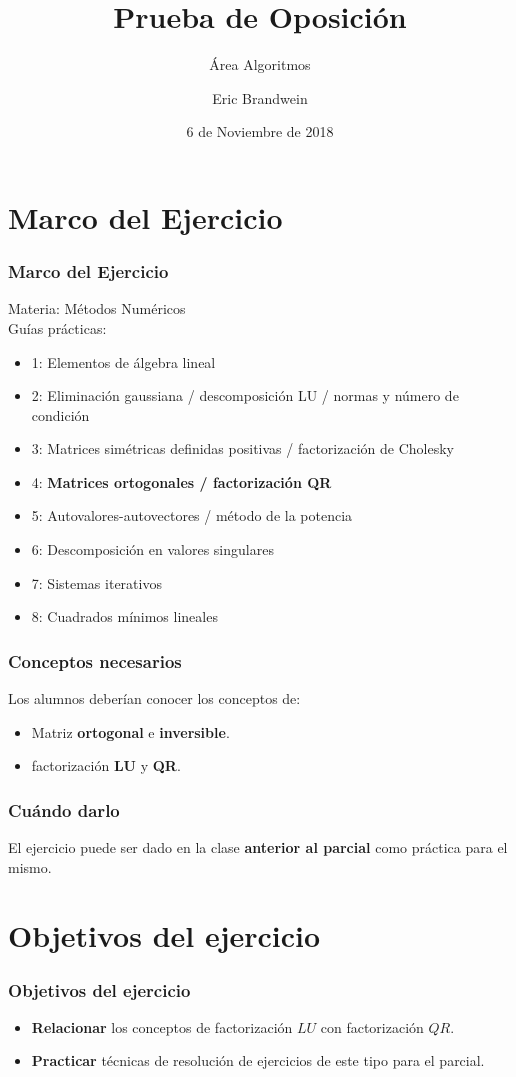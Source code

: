 \documentclass{beamer}
\title{Prueba de Oposición}
\subtitle{Área Algoritmos}
\institute{Universidad de Buenos Aires, FCEyN}
\author{Eric Brandwein}
\date{6 de Noviembre de 2018}
\begin{document}
\frame{\titlepage}

\section{Marco del Ejercicio}
\begin{frame}
\frametitle{Marco del Ejercicio}
\large Materia: Métodos Numéricos
\pause
\\[12pt]
Guías prácticas:
\normalsize
\begin{itemize}
    \item 1: Elementos de álgebra lineal
    \item 2: Eliminación gaussiana / descomposición LU / normas y número de condición
    \item 3: Matrices simétricas definidas positivas / factorización de Cholesky
    \item 4: \textbf{Matrices ortogonales / factorización QR}
    \item 5: Autovalores-autovectores / método de la potencia
    \item 6: Descomposición en valores singulares
    \item 7: Sistemas iterativos
    \item 8: Cuadrados mínimos lineales
\end{itemize}

\end{frame}


\begin{frame}
\frametitle{Conceptos necesarios}
Los alumnos deberían conocer los conceptos de:
\begin{itemize}
    \item Matriz \textbf{ortogonal} e \textbf{inversible}.
    \item factorización \textbf{LU} y \textbf{QR}.
\end{itemize}
\end{frame}


\begin{frame}
\frametitle{Cuándo darlo}
El ejercicio puede ser dado en la clase
\textbf{anterior al parcial} como práctica para el mismo.
\end{frame}

\section{Objetivos del ejercicio}
\begin{frame}
\frametitle{Objetivos del ejercicio}
\begin{itemize}
    \item \textbf{Relacionar} los conceptos de factorización
        $LU$ con factorización $QR$.
    \item \textbf{Practicar} técnicas de resolución de
        ejercicios de este tipo para el parcial.
\end{itemize}
\end{frame}
\end{document}
